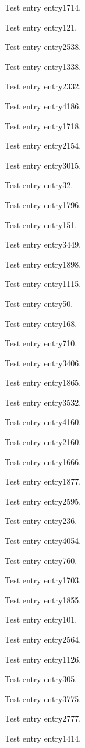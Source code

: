 Test entry \gls{entry1714}.

Test entry \gls{entry121}.

Test entry \gls{entry2538}.

Test entry \gls{entry1338}.

Test entry \gls{entry2332}.

Test entry \gls{entry4186}.

Test entry \gls{entry1718}.

Test entry \gls{entry2154}.

Test entry \gls{entry3015}.

Test entry \gls{entry32}.

Test entry \gls{entry1796}.

Test entry \gls{entry151}.

Test entry \gls{entry3449}.

Test entry \gls{entry1898}.

Test entry \gls{entry1115}.

Test entry \gls{entry50}.

Test entry \gls{entry168}.

Test entry \gls{entry710}.

Test entry \gls{entry3406}.

Test entry \gls{entry1865}.

Test entry \gls{entry3532}.

Test entry \gls{entry4160}.

Test entry \gls{entry2160}.

Test entry \gls{entry1666}.

Test entry \gls{entry1877}.

Test entry \gls{entry2595}.

Test entry \gls{entry236}.

Test entry \gls{entry4054}.

Test entry \gls{entry760}.

Test entry \gls{entry1703}.

Test entry \gls{entry1855}.

Test entry \gls{entry101}.

Test entry \gls{entry2564}.

Test entry \gls{entry1126}.

Test entry \gls{entry305}.

Test entry \gls{entry3775}.

Test entry \gls{entry2777}.

Test entry \gls{entry1414}.


